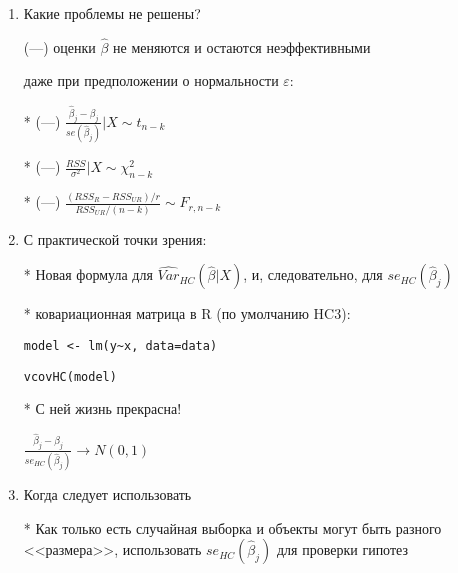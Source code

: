 \documentclass[12pt,a4paper]{article}
\begin{document}
{\begin{enumerate}
* Вместо $\widehat{Var}(\hat{\beta}|X)=\frac{RSS}{n-k}(X'X)^{-1}$ 

использовать $\widehat{Var}_{HC}(\hat{\beta}|X)=(X'X)^{-1}X'\hat{\Omega}X(X'X)^{-1}$

* Уайт, 1980, HC0: 

$\hat{\Omega}=diag( \hat{\varepsilon}_1^2, \ldots, \hat{\varepsilon}_n^2 )$

* Современный вариант, HC3: 

$\hat{\Omega}=diag \left( \frac{\hat{\varepsilon}_1^2}{(1-h_{11})^2}, \ldots, \frac{\varepsilon_n^2}{(1-h_{nn})^2} \right)$

\newpage
\newpage Суть корректировки:

Мы меняем $se(\hat{\beta}_j)$ на $se_{HC}(\hat{\beta}_j)$

Какие проблемы решены?

* $\frac{\hat{\beta}_j-\beta_j}{se_{HC}(\hat{\beta}_j)} \to N(0,1)$ (УРА!)

\item Какие проблемы не решены?

(---) оценки $\hat{\beta}$ не меняются и остаются неэффективными

даже при предположении о нормальности $\varepsilon$:

* (---) $\frac{\hat{\beta}_j-\beta_j}{se(\hat{\beta}_j)} | X \sim t_{n-k}$

* (---) $\frac{RSS}{\sigma^2} |X \sim \chi^2_{n-k}$

* (---) $\frac{(RSS_R-RSS_{UR})/r}{RSS_{UR}/(n-k)} \sim F_{r,n-k}$

\newpage
\item С практической точки зрения:

* Новая формула для $\widehat{Var}_{HC}(\hat{\beta}|X)$, и, следовательно, для  $se_{HC}(\hat{\beta}_j)$

* ковариационная матрица в R (по умолчанию HC3):

\verb|model <- lm(y~x, data=data)|

\verb|vcovHC(model)|

* С ней жизнь прекрасна!

$\frac{\hat{\beta}_j-\beta_j}{se_{HC}(\hat{\beta}_j)} \to N(0,1)$

\item Когда следует использовать 

* Как только есть случайная выборка и объекты могут быть разного <<размера>>, использовать $se_{HC}(\hat{\beta}_j)$ для проверки гипотез


\end{enumerate}}
\end{document}
